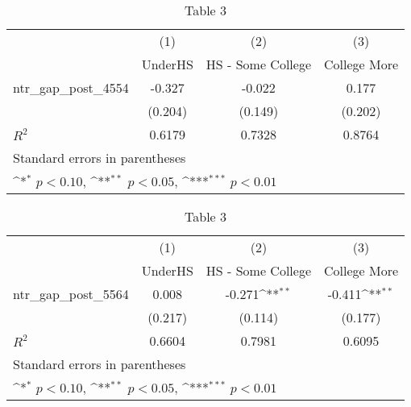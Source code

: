 \begin{table}[htbp]\centering
\def\sym#1{\ifmmode^{#1}\else\(^{#1}\)\fi}
\caption{Table 3}
\begin{tabular}{l*{3}{c}}
\toprule
                    &\multicolumn{1}{c}{(1)}&\multicolumn{1}{c}{(2)}&\multicolumn{1}{c}{(3)}\\
                    &\multicolumn{1}{c}{UnderHS}&\multicolumn{1}{c}{HS - Some College}&\multicolumn{1}{c}{College More}\\
\midrule
ntr\_gap\_post\_4554   &   -0.327         &   -0.022         &    0.177         \\
                    &  (0.204)         &  (0.149)         &  (0.202)         \\
\midrule
\(R^{2}\)           &   0.6179         &   0.7328         &   0.8764         \\
\bottomrule
\multicolumn{4}{l}{\footnotesize Standard errors in parentheses}\\
\multicolumn{4}{l}{\footnotesize \sym{*} \(p<0.10\), \sym{**} \(p<0.05\), \sym{***} \(p<0.01\)}\\
\end{tabular}
\end{table}
\begin{table}[htbp]\centering
\def\sym#1{\ifmmode^{#1}\else\(^{#1}\)\fi}
\caption{Table 3}
\begin{tabular}{l*{3}{c}}
\toprule
                    &\multicolumn{1}{c}{(1)}&\multicolumn{1}{c}{(2)}&\multicolumn{1}{c}{(3)}\\
                    &\multicolumn{1}{c}{UnderHS}&\multicolumn{1}{c}{HS - Some College}&\multicolumn{1}{c}{College More}\\
\midrule
ntr\_gap\_post\_5564   &    0.008         &   -0.271\sym{**} &   -0.411\sym{**} \\
                    &  (0.217)         &  (0.114)         &  (0.177)         \\
\midrule
\(R^{2}\)           &   0.6604         &   0.7981         &   0.6095         \\
\bottomrule
\multicolumn{4}{l}{\footnotesize Standard errors in parentheses}\\
\multicolumn{4}{l}{\footnotesize \sym{*} \(p<0.10\), \sym{**} \(p<0.05\), \sym{***} \(p<0.01\)}\\
\end{tabular}
\end{table}

